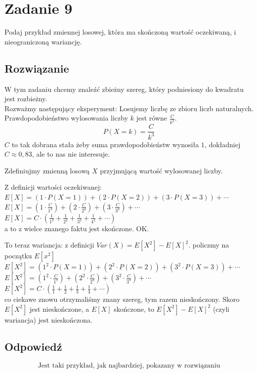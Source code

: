 \section{Zadanie 9}
Podaj przykład zmiennej losowej, która ma skończoną wartość oczekiwaną,
i nieograniczoną wariancję.

\subsection*{Rozwiązanie}
W tym zadaniu chcemy znaleźć zbieżny szereg, który podniesiony do kwadratu jest rozbieżny. \\
Rozważmy następujący eksperyment: Losujemy liczbę ze zbioru liczb naturalnych.
Prawdopodobieństwo wylosowania liczby \(k\) jest równe \(\frac{C}{k^3}\).
\[ P(X=k) = \frac{C}{k^3} \]
\(C\) to tak dobrana stała żeby suma prawdopodobieństw wynosiła \(1\),
dokładniej \(C \approx 0,83\), ale to nas nie interesuje.

Zdefiniujmy zmienną losową \(X\) przyjmującą wartość wylosowanej liczby.

Z definicji wartości oczekiwanej: \\
\(E[X] = (1 \cdot P(X=1)) + (2 \cdot P(X=2)) + (3 \cdot P(X=3)) + \cdots\) \\
\(E[X] = (1 \cdot \frac{C}{1^3}) + (2 \cdot \frac{C}{2^3}) + (3 \cdot \frac{C}{3^3}) + \cdots\) \\
\(E[X] = C \cdot (\frac{1}{1^2} + \frac{1}{2^2} + \frac{1}{3^2} + \frac{1}{4^2} + \cdots)\)\\
a to z wielce znanego faktu jest skończone. OK.

To teraz wariancja:
z definicji \(Var(X) = E[X^2] - E[X]^2\). policzmy na początku \(E[x^2]\)\\
\(E[X^2] = (1^2 \cdot P(X=1)) + (2^2 \cdot P(X=2)) + (3^2 \cdot P(X=3)) + \cdots\) \\
\(E[X^2] = (1^2 \cdot \frac{C}{1^3}) + (2^2 \cdot \frac{C}{2^3}) + (3^2 \cdot \frac{C}{3^3}) + \cdots\) \\
\(E[X^2] = C \cdot (\frac{1}{1} + \frac{1}{2} + \frac{1}{3} + \frac{1}{4} + \cdots)\)\\
co ciekawe znowu otrzymaliśmy znany szereg, tym razem nieskończony.
Skoro \(E[X^2]\) jest nieskończone, a \(E[X]\) skończone, to \(E[X^2] - E[X]^2\) (czyli wariancja) jest nieskończona.

\subsection*{Odpowiedź}
\[
	\boxed{\text{Jest taki przykład, jak najbardziej, pokazany w rozwiązaniu}}
\]
